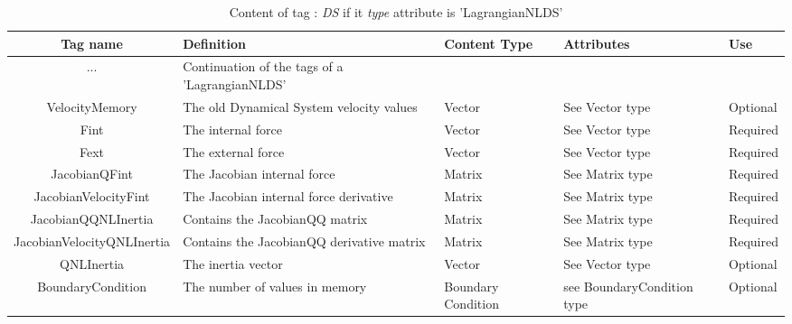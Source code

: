 \begin{table}[htp]
\begin{center}
\begin{tabular}{|c|p{4cm}|p{1.8cm}|p{2.8cm}|p{1.8cm}|}
\hline
\bf{Tag name} & \bf{Definition} & \bf{Content Type} & \bf{Attributes} & \bf{Use}
\\\hline
\hline
...	   & Continuation of the tags of a 'LagrangianNLDS' &  &  &	   \\
\hline
VelocityMemory	  & The old Dynamical System velocity values & Vector & See Vector type &  Optional \\
\hline
Fint	  	  & The internal force & Vector & See Vector type &  Required \\
\hline
Fext	     	  &  The external force & Vector & See Vector type &  Required \\
\hline
JacobianQFint	  & The Jacobian internal force & Matrix & See Matrix type &  Required \\
\hline
JacobianVelocityFint  & The Jacobian internal force derivative & Matrix & See Matrix type &  Required \\
\hline
JacobianQQNLInertia	  & Contains the JacobianQQ matrix & Matrix & See Matrix type &  Required \\
\hline
JacobianVelocityQNLInertia	  & Contains the JacobianQQ derivative matrix & Matrix & See Matrix type &  Required \\
\hline
QNLInertia	  & The inertia vector & Vector & See Vector type &  Optional \\
\hline
BoundaryCondition	  & The number of values in memory & Boundary Condition & see BoundaryCondition type &  Optional \\
\hline
\end{tabular}
\end{center}
\caption{Content of tag : \textit{DS} if it \textit{type} attribute is 'LagrangianNLDS'}
\end{table}




